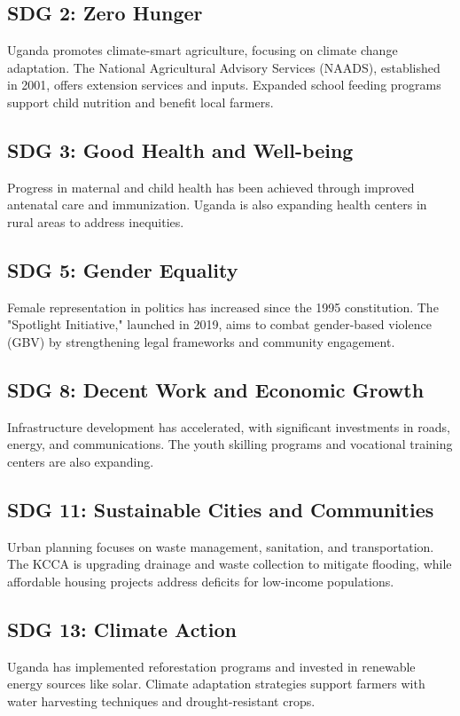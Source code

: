 \documentclass[11pt]{article}
\begin{document}
\subsection*{SDG 2: Zero Hunger}
Uganda promotes climate-smart agriculture, focusing on climate change adaptation. The National Agricultural Advisory Services (NAADS), established in 2001, offers extension services and inputs. Expanded school feeding programs support child nutrition and benefit local farmers.

\subsection*{SDG 3: Good Health and Well-being}
Progress in maternal and child health has been achieved through improved antenatal care and immunization. Uganda is also expanding health centers in rural areas to address inequities.

\subsection*{SDG 5: Gender Equality}
Female representation in politics has increased since the 1995 constitution. The "Spotlight Initiative," launched in 2019, aims to combat gender-based violence (GBV) by strengthening legal frameworks and community engagement.

\subsection*{SDG 8: Decent Work and Economic Growth}
Infrastructure development has accelerated, with significant investments in roads, energy, and communications. The youth skilling programs and vocational training centers are also expanding.

\subsection*{SDG 11: Sustainable Cities and Communities}
Urban planning focuses on waste management, sanitation, and transportation. The KCCA is upgrading drainage and waste collection to mitigate flooding, while affordable housing projects address deficits for low-income populations.

\subsection*{SDG 13: Climate Action}
Uganda has implemented reforestation programs and invested in renewable energy sources like solar. Climate adaptation strategies support farmers with water harvesting techniques and drought-resistant crops.
\end{document}
